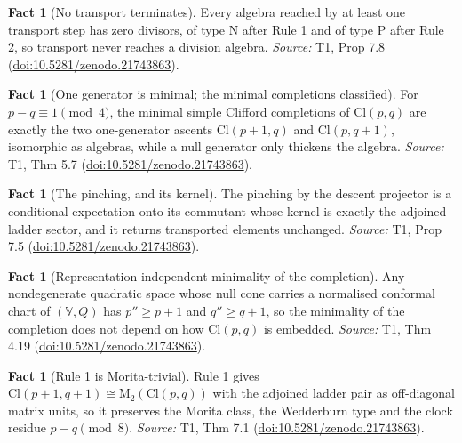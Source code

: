 \documentclass[11pt]{article}
\theoremstyle{definition}
\newtheorem{fact}[theorem]{Fact}
\theoremstyle{plain}
\providecommand{\Cl}{}\renewcommand{\Cl}{\mathrm{Cl}}
\providecommand{\Mat}{}\renewcommand{\Mat}{\mathrm{M}}
\begin{document}
\begin{fact}[No transport terminates]\label{c:transport.no-transport-terminates}
Every algebra reached by at least one transport step has zero divisors, of type N after Rule 1 and of type P after Rule 2, so transport never reaches a division algebra.
\emph{Source:} T1, Prop 7.8 (\href{https://doi.org/10.5281/zenodo.21743863}{doi:10.5281/zenodo.21743863}).
\end{fact}

\begin{fact}[One generator is minimal; the minimal completions classified]\label{c:transport.one-generator-minimal-minimal-completions-classified}
For $p - q \equiv 1 \pmod 4$, the minimal simple Clifford completions of $\Cl(p,q)$ are exactly the two one-generator ascents $\Cl(p{+}1,q)$ and $\Cl(p,q{+}1)$, isomorphic as algebras, while a null generator only thickens the algebra.
\emph{Source:} T1, Thm 5.7 (\href{https://doi.org/10.5281/zenodo.21743863}{doi:10.5281/zenodo.21743863}).
\end{fact}

\begin{fact}[The pinching, and its kernel]\label{c:transport.pinching-kernel}
The pinching by the descent projector is a conditional expectation onto its commutant whose kernel is exactly the adjoined ladder sector, and it returns transported elements unchanged.
\emph{Source:} T1, Prop 7.5 (\href{https://doi.org/10.5281/zenodo.21743863}{doi:10.5281/zenodo.21743863}).
\end{fact}

\begin{fact}[Representation-independent minimality of the completion]\label{c:transport.representation-independent-minimality-completion}
Any nondegenerate quadratic space whose null cone carries a normalised conformal chart of $(\mathbb{V}, Q)$ has $p'' \geq p + 1$ and $q'' \geq q + 1$, so the minimality of the completion does not depend on how $\Cl(p,q)$ is embedded.
\emph{Source:} T1, Thm 4.19 (\href{https://doi.org/10.5281/zenodo.21743863}{doi:10.5281/zenodo.21743863}).
\end{fact}

\begin{fact}[Rule 1 is Morita-trivial]\label{c:transport.rule-1-morita-trivial}
Rule 1 gives $\Cl(p+1, q+1) \cong \Mat_2(\Cl(p,q))$ with the adjoined ladder pair as off-diagonal matrix units, so it preserves the Morita class, the Wedderburn type and the clock residue $p - q \pmod 8$.
\emph{Source:} T1, Thm 7.1 (\href{https://doi.org/10.5281/zenodo.21743863}{doi:10.5281/zenodo.21743863}).
\end{fact}
\end{document}
